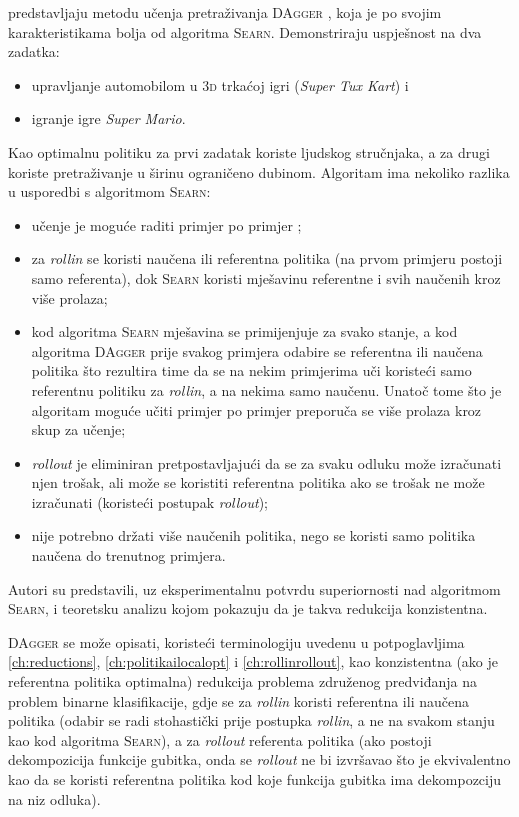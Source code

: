 \citet{ross2011reduction} predstavljaju metodu učenja pretraživanja
\textsc{DAgger} , koja je po svojim
karakteristikama bolja od algoritma \textsc{Searn}. Demonstriraju uspješnost na
dva zadatka:
\begin{itemize}
  \item upravljanje automobilom u \textsc{3d} trkaćoj igri (\textit{Super Tux
  Kart}) i
  \item igranje igre \textit{Super Mario}.
\end{itemize}
Kao optimalnu politiku za prvi zadatak koriste ljudskog stručnjaka, a za drugi
koriste pretraživanje u širinu  ograničeno
dubinom. Algoritam ima nekoliko razlika u usporedbi s algoritmom \textsc{Searn}:
\begin{itemize}
  \item učenje je moguće raditi primjer po primjer ;
  \item za \textit{rollin} se koristi naučena ili referentna politika (na prvom
  primjeru postoji samo referenta), dok \textsc{Searn} koristi mješavinu
  referentne i svih naučenih kroz više prolaza;
  \item kod algoritma \textsc{Searn} mješavina se primijenjuje za svako stanje,
  a kod algoritma \textsc{DAgger} prije svakog primjera odabire se referentna
  ili naučena politika što rezultira time da se na nekim primjerima uči koristeći
  samo referentnu politiku za \textit{rollin}, a na nekima samo naučenu. Unatoč
  tome što je algoritam moguće učiti primjer po primjer preporuča se više
  prolaza kroz skup za učenje;
  \item \textit{rollout} je eliminiran pretpostavljajući da se za svaku odluku
  može izračunati njen trošak, ali može se koristiti referentna politika ako se
  trošak ne može izračunati (koristeći postupak \textit{rollout});
  \item nije potrebno držati više naučenih politika, nego se koristi samo politika
  naučena do trenutnog primjera.
\end{itemize}
Autori su predstavili, uz eksperimentalnu potvrdu superiornosti nad algoritmom
\textsc{Searn}, i teoretsku analizu kojom pokazuju da je takva redukcija
konzistentna.

\textsc{DAgger} se može opisati, koristeći terminologiju uvedenu u
potpoglavljima \ref{ch:reductions}, \ref{ch:politikailocalopt} i
\ref{ch:rollinrollout}, kao konzistentna (ako je referentna politika optimalna)
redukcija problema združenog predviđanja na problem binarne klasifikacije, gdje
se za \textit{rollin} koristi referentna ili naučena politika (odabir se radi
stohastički prije postupka \textit{rollin}, a ne na svakom stanju kao kod
algoritma \textsc{Searn}), a za \textit{rollout} referenta politika (ako postoji
dekompozicija funkcije gubitka, onda se \textit{rollout} ne bi izvršavao što je
ekvivalentno kao da se koristi referentna politika kod koje funkcija gubitka ima
dekompozciju na niz odluka).
